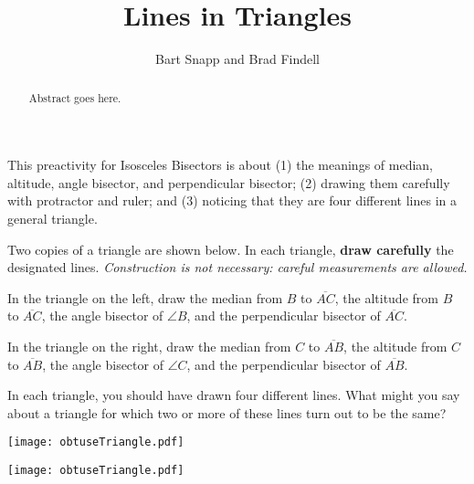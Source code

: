 \documentclass{ximera}
\title{Lines in Triangles}
\author{Bart Snapp and Brad Findell}
\begin{document}
\begin{abstract}
Abstract goes here.  
\end{abstract}
\maketitle

\begin{teachingnote}
This preactivity for Isosceles Bisectors is about (1) the meanings of median, altitude, angle bisector, and perpendicular bisector; (2) drawing them carefully with protractor and ruler; and (3) noticing that they are four different lines in a general triangle. 
\end{teachingnote}

Two copies of a triangle are shown below.   In each triangle, \textbf{draw carefully} the designated lines.  \emph{Construction is not necessary:  careful measurements are allowed.}

\begin{problem}
In the triangle on the left, draw the median from $B$ to $\overline{AC}$, the altitude from $B$ to $\overline{AC}$, the angle bisector of $\angle B$, and the perpendicular bisector of $\overline{AC}$.  

\end{problem}

\begin{problem}
In the triangle on the right, draw the median from $C$ to $\overline{AB}$, the altitude from $C$ to $\overline{AB}$, the angle bisector of $\angle C$, and the perpendicular bisector of $\overline{AB}$. 

%
\end{problem}

\begin{problem}
In each triangle, you should have drawn four different lines.  What might you say about a triangle for which two or more of these lines turn out to be the same?  
\end{problem}

\texttt{[image: obtuseTriangle.pdf]}

\texttt{[image: obtuseTriangle.pdf]}
\end{document}
